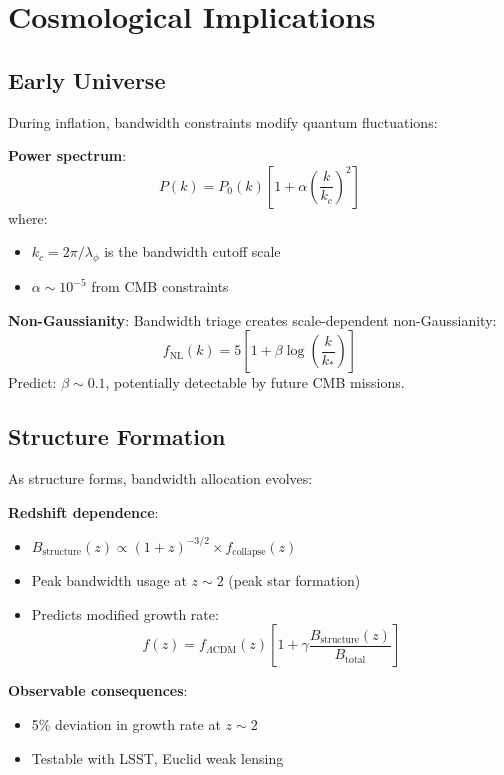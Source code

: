 \documentclass[twocolumn,prd,amsmath,amssymb,aps,superscriptaddress,nofootinbib]{revtex4-2}
\begin{document}
\section{Cosmological Implications}
\label{sec:cosmology}

\subsection{Early Universe}

During inflation, bandwidth constraints modify quantum fluctuations:

\textbf{Power spectrum}:
\begin{equation}
P(k) = P_0(k)\left[1 + \alpha\left(\frac{k}{k_c}\right)^2\right]
\end{equation}
where:
\begin{itemize}
\item $k_c = 2\pi/\lambda_\phi$ is the bandwidth cutoff scale
\item $\alpha \sim 10^{-5}$ from CMB constraints
\end{itemize}

\textbf{Non-Gaussianity}:
Bandwidth triage creates scale-dependent non-Gaussianity:
\begin{equation}
f_{\text{NL}}(k) = 5\left[1 + \beta \log\left(\frac{k}{k_*}\right)\right]
\end{equation}
Predict: $\beta \sim 0.1$, potentially detectable by future CMB missions.

\subsection{Structure Formation}

As structure forms, bandwidth allocation evolves:

\textbf{Redshift dependence}:
\begin{itemize}
\item $B_{\text{structure}}(z) \propto (1+z)^{-3/2} \times f_{\text{collapse}}(z)$
\item Peak bandwidth usage at $z \sim 2$ (peak star formation)
\item Predicts modified growth rate:
\begin{equation}
f(z) = f_{\Lambda\text{CDM}}(z)\left[1 + \gamma \frac{B_{\text{structure}}(z)}{B_{\text{total}}}\right]
\end{equation}
\end{itemize}

\textbf{Observable consequences}:
\begin{itemize}
\item 5\% deviation in growth rate at $z \sim 2$
\item Testable with LSST, Euclid weak lensing
\end{itemize}
\end{document}
